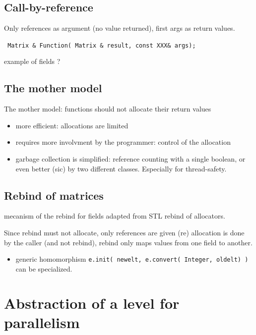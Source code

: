 \documentclass[runningheads,a4paper]{llncs}
\begin{document}
\subsection{Call-by-reference}

Only references as argument (no value returned), first args as return
values.

\verb! Matrix & Function( Matrix & result, const XXX& args); !

example of fields \cite[\S 2.1]{jgd:2002:icms} ?

\subsection{The mother model}


The mother model: functions should not allocate their return values

\begin{itemize}
\item more efficient: allocations are limited

\item requires more involvment by the programmer: control of the allocation

\item garbage collection is simplified: reference counting with a single
boolean, or even better (sic) by two different classes.
Especially for thread-safety.
\end{itemize}


\subsection{Rebind of matrices}

mecanism of the rebind for fields adapted from STL rebind of
allocators.

Since rebind must not allocate, only references are given (re)
allocation is done by the caller (and not rebind), rebind only maps
values from one field to another.

\begin{itemize}
\item generic homomorphism 
\verb!e.init( newelt, e.convert( Integer, oldelt) )!
can be specialized.
\end{itemize}

\section{Abstraction of a level for parallelism}
\end{document}
